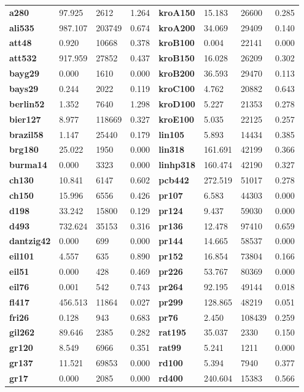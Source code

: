 \documentclass{article}
\begin{document}
\begin{table}[H]
\begin{tabular}{>{\bfseries}llll>{\bfseries}llll}
\midrule
a280 & 97.925 & 2612 & 1.264 & kroA150 & 15.183 & 26600 & 0.285 \\
ali535 & 987.107 & 203749 & 0.674 & kroA200 & 34.069 & 29409 & 0.140 \\
att48 & 0.920 & 10668 & 0.378 & kroB100 & 0.004 & 22141 & 0.000 \\
att532 & 917.959 & 27852 & 0.437 & kroB150 & 16.028 & 26209 & 0.302 \\
bayg29 & 0.000 & 1610 & 0.000 & kroB200 & 36.593 & 29470 & 0.113 \\
bays29 & 0.244 & 2022 & 0.119 & kroC100 & 4.762 & 20882 & 0.643 \\
berlin52 & 1.352 & 7640 & 1.298 & kroD100 & 5.227 & 21353 & 0.278 \\
bier127 & 8.977 & 118669 & 0.327 & kroE100 & 5.035 & 22125 & 0.257 \\
brazil58 & 1.147 & 25440 & 0.179 & lin105 & 5.893 & 14434 & 0.385 \\
brg180 & 25.022 & 1950 & 0.000 & lin318 & 161.691 & 42199 & 0.366 \\
burma14 & 0.000 & 3323 & 0.000 & linhp318 & 160.474 & 42190 & 0.327 \\
ch130 & 10.841 & 6147 & 0.602 & pcb442 & 272.519 & 51017 & 0.278 \\
ch150 & 15.996 & 6556 & 0.426 & pr107 & 6.583 & 44303 & 0.000 \\
d198 & 33.242 & 15800 & 0.129 & pr124 & 9.437 & 59030 & 0.000 \\
d493 & 732.624 & 35153 & 0.316 & pr136 & 12.478 & 97410 & 0.659 \\
dantzig42 & 0.000 & 699 & 0.000 & pr144 & 14.665 & 58537 & 0.000 \\
eil101 & 4.557 & 635 & 0.890 & pr152 & 16.854 & 73804 & 0.166 \\
eil51 & 0.000 & 428 & 0.469 & pr226 & 53.767 & 80369 & 0.000 \\
eil76 & 0.001 & 542 & 0.743 & pr264 & 92.195 & 49144 & 0.018 \\
fl417 & 456.513 & 11864 & 0.027 & pr299 & 128.865 & 48219 & 0.051 \\
fri26 & 0.128 & 943 & 0.683 & pr76 & 2.450 & 108439 & 0.259 \\
gil262 & 89.646 & 2385 & 0.282 & rat195 & 35.037 & 2330 & 0.150 \\
gr120 & 8.549 & 6966 & 0.351 & rat99 & 5.241 & 1211 & 0.000 \\
gr137 & 11.521 & 69853 & 0.000 & rd100 & 5.394 & 7940 & 0.377 \\
gr17 & 0.000 & 2085 & 0.000 & rd400 & 240.604 & 15383 & 0.566 \\

\end{tabular}
\end{table}
\end{document}
